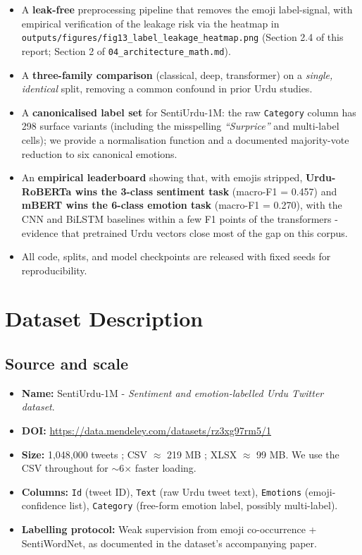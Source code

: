 \documentclass[
  english,
  11pt,
]{article}
\providecommand{\tightlist}{%
  \setlength{\itemsep}{0pt}\setlength{\parskip}{0pt}}
\begin{document}
\begin{itemize}
\tightlist
\item
  A \textbf{leak-free} preprocessing pipeline that removes the emoji
  label-signal, with empirical verification of the leakage risk via the
  heatmap in \texttt{outputs/figures/fig13\_label\_leakage\_heatmap.png}
  (Section 2.4 of this report; Section 2 of
  \texttt{04\_architecture\_math.md}).
\item
  A \textbf{three-family comparison} (classical, deep, transformer) on a
  \emph{single, identical} split, removing a common confound in prior
  Urdu studies.
\item
  A \textbf{canonicalised label set} for SentiUrdu-1M: the raw
  \texttt{Category} column has 298 surface variants (including the
  misspelling \emph{``Surprice''} and multi-label cells); we provide a
  normalisation function and a documented majority-vote reduction to six
  canonical emotions.
\item
  An \textbf{empirical leaderboard} showing that, with emojis stripped,
  \textbf{Urdu-RoBERTa wins the 3-class sentiment task} (macro-F1 =
  0.457) and \textbf{mBERT wins the 6-class emotion task} (macro-F1 =
  0.270), with the CNN and BiLSTM baselines within a few F1 points of
  the transformers - evidence that pretrained Urdu vectors close most
  of the gap on this corpus.
\item
  All code, splits, and model checkpoints are released with fixed seeds
  for reproducibility.
\end{itemize}

\newpage

\section{Dataset Description}\label{dataset-description}

\subsection{Source and scale}\label{source-and-scale}

\begin{itemize}
\tightlist
\item
  \textbf{Name:} SentiUrdu-1M - \emph{Sentiment and emotion-labelled
  Urdu Twitter dataset}.
\item
  \textbf{DOI:} \url{https://data.mendeley.com/datasets/rz3xg97rm5/1}
\item
  \textbf{Size:} 1,048,000 tweets ; CSV $\approx$ 219 MB ; XLSX $\approx$ 99 MB. We use
  the CSV throughout for $\sim$6$\times$ faster loading.
\item
  \textbf{Columns:} \texttt{Id} (tweet ID), \texttt{Text} (raw Urdu
  tweet text), \texttt{Emotions} (emoji-confidence list),
  \texttt{Category} (free-form emotion label, possibly multi-label).
\item
  \textbf{Labelling protocol:} Weak supervision from emoji co-occurrence
  + SentiWordNet, as documented in the dataset's accompanying paper.
\end{itemize}
\end{document}
